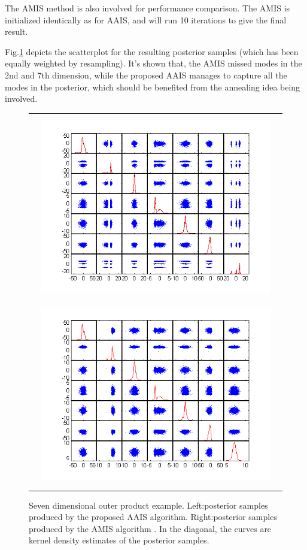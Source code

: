 The AMIS method \citep{cappe2008ais} is also involved for
performance comparison. The AMIS is initialized identically as for
AAIS, and will run 10 iterations to give the final result.

Fig.\ref{fig:7D_scatter} depicts the scatterplot for the resulting
posterior samples (which has been equally weighted by resampling).
It's shown that, the AMIS missed modes in the 2nd and 7th dimension,
while the proposed AAIS manages to capture all the modes in the
posterior, which should be benefited from the annealing idea being
involved.

\begin{figure}[!htb]
\begin{tabular}{c}
\centerline{\includegraphics[width=4in,height=3.2in]{Fig/seven_outer_product_scatter.png}\includegraphics[width=4in,height=3.2in]{Fig/AIS_7d_outter_scatter.png}}
\end{tabular}
\caption{Seven dimensional outer product example. Left:posterior
samples produced by the proposed AAIS algorithm. Right:posterior
samples produced by the AMIS algorithm \citep{cappe2008ais}. In the
diagonal, the curves are kernel density estimates of the posterior
samples.} \label{fig:7D_scatter}
\end{figure}

